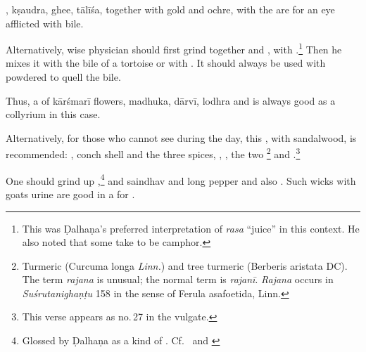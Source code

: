 \begin{translation}
    \item[11cd--12ab]
    
    , \gls{kṣaudra}, ghee,
\gls{tālīśa}, together with gold and ochre, with the
 are for an eye afflicted with bile.
    
    \item [12cd--13] 
    
    Alternatively, wise physician should first grind together 
    and ,  with .\footnote{This was Ḍalhaṇa's preferred interpretation
    of \emph{rasa} “juice” in this context.  He also noted that some take
     to be camphor.}  Then he mixes it with the bile of a
    tortoise or with .  It should always be used
    with powdered  to quell the bile.
    
    \item[14]
    
    Thus, a  of \gls{kārśmarī} flowers, 
    \gls{madhuka},
    \gls{dārvī}, \gls{lodhra} and 
    is always good as a collyrium in this case.
    
    
    \item [15]
    
    Alternatively, for those who cannot see during the day, this ,
    with sandalwood, is recommended: , conch shell and the three
    spices, , , the two
    \footnote{Turmeric (Curcuma longa \textit{Linn.}) and tree
    turmeric (Berberis aristata DC).  The term \emph{rajana} is unusual; the normal
    term is \emph{rajanī}. \emph{Rajana} occurs in \emph{Suśrutanighaṇṭu} 158 in the
    sense of Ferula asafoetida, Linn.} and .\footnote{This verse appears as no.\,27 in the vulgate.}
    
    \item [16] One should grind up ,\footnote{Glossed by Ḍalhaṇa as
    a kind of .\label{srotas-kohl}  Cf.\ 
    \cite[2.M13]{NK} and 
    \cite[197--198]{shar-1982}}
    and \gls{saindhav} and long pepper and also 
    .  
    Such wicks with goats urine are good in a  for
    \se{kṣaṇadāndhya}{night blindness}.
    

\end{translation}
